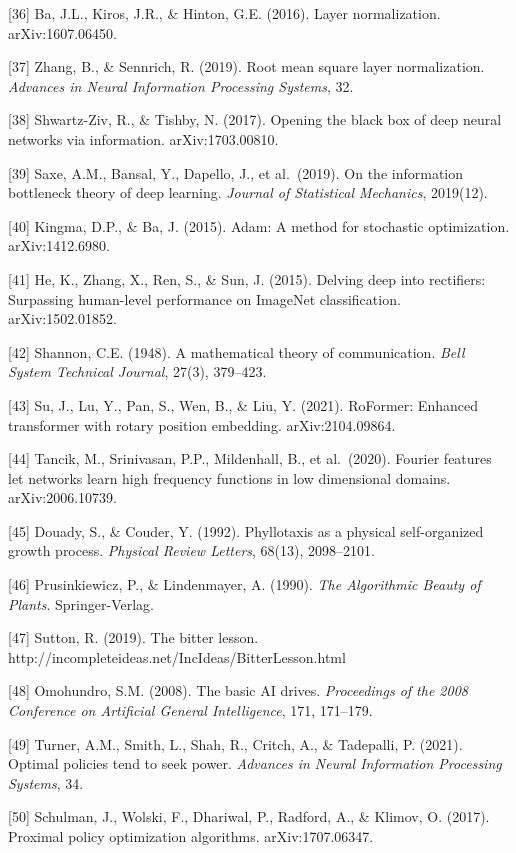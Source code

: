 \documentclass[
  11pt,
  letterpaper,
]{article}
\begin{document}
{[}36{]} Ba, J.L., Kiros, J.R., \& Hinton, G.E. (2016). Layer
normalization. arXiv:1607.06450.

{[}37{]} Zhang, B., \& Sennrich, R. (2019). Root mean square layer
normalization. \emph{Advances in Neural Information Processing Systems},
32.

{[}38{]} Shwartz-Ziv, R., \& Tishby, N. (2017). Opening the black box of
deep neural networks via information. arXiv:1703.00810.

{[}39{]} Saxe, A.M., Bansal, Y., Dapello, J., et al.~(2019). On the
information bottleneck theory of deep learning. \emph{Journal of
Statistical Mechanics}, 2019(12).

{[}40{]} Kingma, D.P., \& Ba, J. (2015). Adam: A method for stochastic
optimization. arXiv:1412.6980.

{[}41{]} He, K., Zhang, X., Ren, S., \& Sun, J. (2015). Delving deep
into rectifiers: Surpassing human-level performance on ImageNet
classification. arXiv:1502.01852.

{[}42{]} Shannon, C.E. (1948). A mathematical theory of communication.
\emph{Bell System Technical Journal}, 27(3), 379--423.

{[}43{]} Su, J., Lu, Y., Pan, S., Wen, B., \& Liu, Y. (2021). RoFormer:
Enhanced transformer with rotary position embedding. arXiv:2104.09864.

{[}44{]} Tancik, M., Srinivasan, P.P., Mildenhall, B., et al.~(2020).
Fourier features let networks learn high frequency functions in low
dimensional domains. arXiv:2006.10739.

{[}45{]} Douady, S., \& Couder, Y. (1992). Phyllotaxis as a physical
self-organized growth process. \emph{Physical Review Letters}, 68(13),
2098--2101.

{[}46{]} Prusinkiewicz, P., \& Lindenmayer, A. (1990). \emph{The
Algorithmic Beauty of Plants}. Springer-Verlag.

{[}47{]} Sutton, R. (2019). The bitter lesson.
http://incompleteideas.net/IncIdeas/BitterLesson.html

{[}48{]} Omohundro, S.M. (2008). The basic AI drives. \emph{Proceedings
of the 2008 Conference on Artificial General Intelligence}, 171,
171--179.

{[}49{]} Turner, A.M., Smith, L., Shah, R., Critch, A., \& Tadepalli, P.
(2021). Optimal policies tend to seek power. \emph{Advances in Neural
Information Processing Systems}, 34.

{[}50{]} Schulman, J., Wolski, F., Dhariwal, P., Radford, A., \& Klimov,
O. (2017). Proximal policy optimization algorithms. arXiv:1707.06347.
\end{document}
